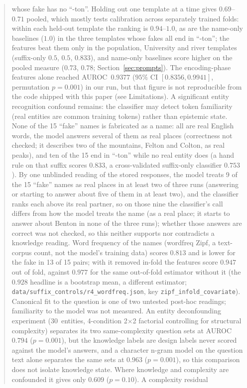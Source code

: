 \documentclass[11pt,a4paper]{article}
\begin{document}
\begin{abstract}
whose fake has no ``-ton''. Holding out one template at a time gives
$0.69$--$0.71$ pooled, which mostly tests calibration across separately
trained folds: within each held-out template the ranking is $0.94$--$1.0$, as are the name-only baselines ($1.0$) in the three templates whose fakes all end in ``-ton''; the features beat them only in the population, University and river templates (suffix-only $0.5$, $0.5$, $0.833$), and name-only baselines score higher on the pooled measure ($0.73$, $0.78$; Section~\ref{sec:prompts}). The encoding-phase features alone reached
AUROC~$0.9377$ ($95\%$ CI $[0.8356, 0.9941]$, permutation
$p{=}0.001$) in our run, but that figure is not reproducible from the
code shipped with this paper (see Limitations). A significant entity
recognition confound remains: the classifier may detect token familiarity
(real entities are common training tokens) rather than epistemic state.
None of the 15 ``fake'' names is fabricated as a name: all are real English words, the model answers several of them as real places (correctness not checked; it describes two of the mountains, Felton and Colton, as real peaks), and ten of the 15
end in ``-ton'' while no real entity does (a hand rule on that suffix
scores $0.833$, a cross-validated suffix-only classifier $0.753$). By one unblinded reading of the stored responses, the model treats 9 of the 15 ``fake'' names as real places in at least two of three runs (answering or starting to answer about five of them in at least two), and the classifier ranks each above its real partner, so on those nine the classifier's call differs from how the model treats the name (as a real place; it starts to answer about Benton in none of the three runs); whether those answers are correct was not checked, so this neither supports nor contradicts a knowledge reading.
Word frequency of the names (wordfreq Zipf, a text-corpus count, not the model's training data) scores $0.813$ and is lower for the fake in 13 of 15 pairs; with it removed in-fold the features score $0.947$ out of fold, against $0.977$ for the same out-of-fold estimator without it (the $0.928$ headline is a bootstrap mean, a different estimator; \texttt{data/suffix\_controls/r4\_wordfreq.json}, key \texttt{zipf\_infold\_covariate}). Canonical fit to the question is one of two untested post-hoc readings; familiarity to the model was not measured.
An entity deconfounding experiment (30~entities, 4-condition 2$\times$2
factorial controlling for structural complexity) separates its two same-complexity question sets at AUROC~$0.794$ ($p{=}0.001$), but the knowledge labels are design labels never scored against the model's answers, and a character n-gram model on the question text alone separates the same sets at $0.963$ ($p{=}0.001$), so this comparison does not isolate knowledge state. Where knowledge and complexity are confounded it gives only $0.609$ ($p{=}0.10$). A complexity residual

\end{abstract}
\end{document}
